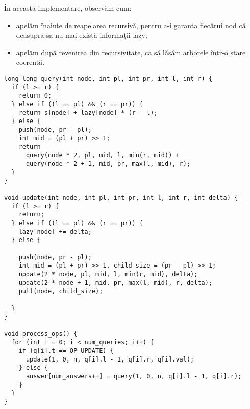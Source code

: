 În această implementare, observăm cum:

\begin{itemize}
  \item apelăm  înainte de reapelarea recursivă, pentru a-i garanta fiecărui nod că deasupra sa nu mai există informații lazy;

  \item apelăm  după revenirea din recursivitate, ca să lăsăm arborele într-o stare coerentă.
\end{itemize}

\begin{verbatim}
long long query(int node, int pl, int pr, int l, int r) {
  if (l >= r) {
    return 0;
  } else if ((l == pl) && (r == pr)) {
    return s[node] + lazy[node] * (r - l);
  } else {
    push(node, pr - pl);
    int mid = (pl + pr) >> 1;
    return
      query(node * 2, pl, mid, l, min(r, mid)) +
      query(node * 2 + 1, mid, pr, max(l, mid), r);
  }
}

void update(int node, int pl, int pr, int l, int r, int delta) {
  if (l >= r) {
    return;
  } else if ((l == pl) && (r == pr)) {
    lazy[node] += delta;
  } else {

    push(node, pr - pl);
    int mid = (pl + pr) >> 1, child_size = (pr - pl) >> 1;
    update(2 * node, pl, mid, l, min(r, mid), delta);
    update(2 * node + 1, mid, pr, max(l, mid), r, delta);
    pull(node, child_size);

  }
}

void process_ops() {
  for (int i = 0; i < num_queries; i++) {
    if (q[i].t == OP_UPDATE) {
      update(1, 0, n, q[i].l - 1, q[i].r, q[i].val);
    } else {
      answer[num_answers++] = query(1, 0, n, q[i].l - 1, q[i].r);
    }
  }
}
\end{verbatim}
